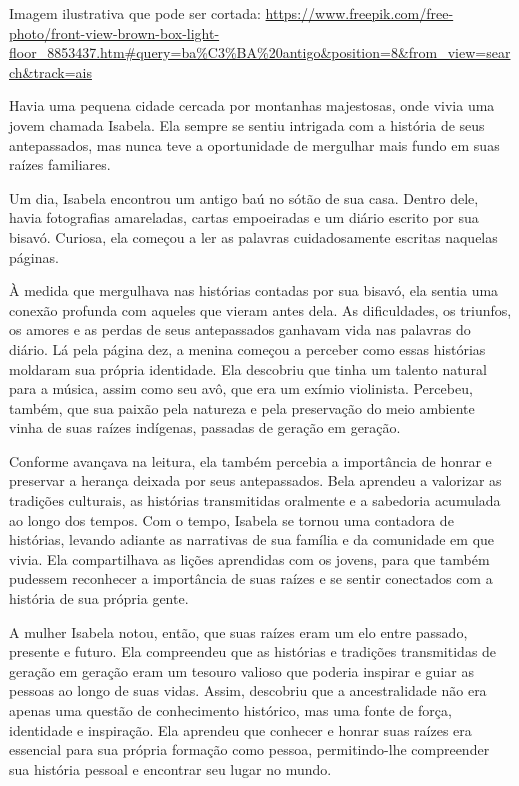 \begin{escolha}
\begin{escolha}
\begin{escolha}
\begin{escolha}
\begin{escolha}
\begin{escolha}
\begin{escolha}
\begin{escolha}
\begin{escolha}
\begin{escolha}
\begin{escolha}
\begin{escolha}
Imagem ilustrativa que pode ser cortada:
\url{https://www.freepik.com/free-photo/front-view-brown-box-light-floor_8853437.htm\#query=ba\%C3\%BA\%20antigo\&position=8\&from_view=search\&track=ais}

Havia uma pequena cidade cercada por montanhas majestosas, onde vivia
uma jovem chamada Isabela. Ela sempre se sentiu intrigada com a história
de seus antepassados, mas nunca teve a oportunidade de mergulhar mais
fundo em suas raízes familiares.

Um dia, Isabela encontrou um antigo baú no sótão de sua casa. Dentro
dele, havia fotografias amareladas, cartas empoeiradas e um diário
escrito por sua bisavó. Curiosa, ela começou a ler as palavras
cuidadosamente escritas naquelas páginas.

À medida que mergulhava nas histórias contadas por sua bisavó, ela
sentia uma conexão profunda com aqueles que vieram antes dela. As
dificuldades, os triunfos, os amores e as perdas de seus antepassados
ganhavam vida nas palavras do diário. Lá pela página dez, a menina
começou a perceber como essas histórias moldaram sua própria identidade.
Ela descobriu que tinha um talento natural para a música, assim como seu
avô, que era um exímio violinista. Percebeu, também, que sua paixão pela
natureza e pela preservação do meio ambiente vinha de suas raízes
indígenas, passadas de geração em geração.

Conforme avançava na leitura, ela também percebia a importância de
honrar e preservar a herança deixada por seus antepassados. Bela
aprendeu a valorizar as tradições culturais, as histórias transmitidas
oralmente e a sabedoria acumulada ao longo dos tempos. Com o tempo,
Isabela se tornou uma contadora de histórias, levando adiante as
narrativas de sua família e da comunidade em que vivia. Ela
compartilhava as lições aprendidas com os jovens, para que também
pudessem reconhecer a importância de suas raízes e se sentir conectados
com a história de sua própria gente.

A mulher Isabela notou, então, que suas raízes eram um elo entre
passado, presente e futuro. Ela compreendeu que as histórias e tradições
transmitidas de geração em geração eram um tesouro valioso que poderia
inspirar e guiar as pessoas ao longo de suas vidas. Assim, descobriu que
a ancestralidade não era apenas uma questão de conhecimento histórico,
mas uma fonte de força, identidade e inspiração. Ela aprendeu que
conhecer e honrar suas raízes era essencial para sua própria formação
como pessoa, permitindo-lhe compreender sua história pessoal e encontrar
seu lugar no mundo.


\end{escolha}
\end{escolha}
\end{escolha}
\end{escolha}
\end{escolha}
\end{escolha}
\end{escolha}
\end{escolha}
\end{escolha}
\end{escolha}
\end{escolha}
\end{escolha}
